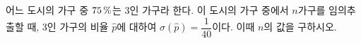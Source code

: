 어느 도시의 가구 중 $75\mkern3mu \%$는 3인 가구라 한다. 이 도시의 가구 중에서 $n$가구를 임의추출할 때, 3인 가구의 비율 $\hat{p}$에 대하여 $\sigma(\hat{p})=\dfrac{1}{40}$이다. 이때 $n$의 값을 구하시오.
